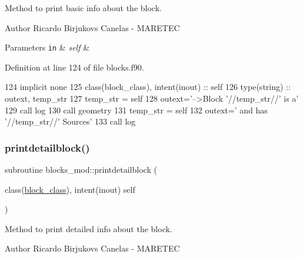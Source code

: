 Method to print basic info about the block. 

\begin{DoxyAuthor}{Author}
Ricardo Birjukovs Canelas -\/ M\+A\+R\+E\+T\+EC
\end{DoxyAuthor}

\begin{DoxyParams}[1]{Parameters}
\mbox{\tt in}  & {\em self} & \\
\hline
\end{DoxyParams}


Definition at line 124 of file blocks.\+f90.


\begin{DoxyCode}
124     \textcolor{keywordtype}{implicit none}
125     \textcolor{keywordtype}{class}(block\_class), \textcolor{keywordtype}{intent(inout)} :: self
126     \textcolor{keywordtype}{type}(string) :: outext, temp\_str
127     temp\_str = self%
128     outext=\textcolor{stringliteral}{'-->Block '}//temp\_str//\textcolor{stringliteral}{' is a'}
129     \textcolor{keyword}{call }log%
130     \textcolor{keyword}{call }geometry%
131     temp\_str = self%
132     outext=\textcolor{stringliteral}{'      and has '}//temp\_str//\textcolor{stringliteral}{' Sources'}
133     \textcolor{keyword}{call }log%
\end{DoxyCode}
\mbox{\label{namespaceblocks__mod_a10f356706988c45a255922fe70851488}} 
\subsubsection{\texorpdfstring{printdetailblock()}{printdetailblock()}}
{\footnotesize\ttfamily subroutine blocks\+\_\+mod\+::printdetailblock (\begin{DoxyParamCaption}\item[{class(\mbox{\hyperlink{structblocks__mod_1_1block__class}{block\+\_\+class}}), intent(inout)}]{self }\end{DoxyParamCaption})\hspace{0.3cm}{\ttfamily [private]}}



Method to print detailed info about the block. 

\begin{DoxyAuthor}{Author}
Ricardo Birjukovs Canelas -\/ M\+A\+R\+E\+T\+EC
\end{DoxyAuthor}

